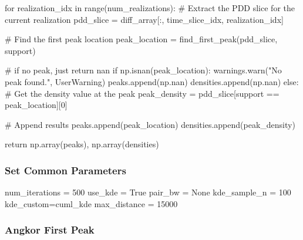 \documentclass[
  11pt,
  letterpaper,
  DIV=11,
  numbers=noendperiod]{scrartcl}
\newenvironment{Shaded}{\begin{snugshade}}{\end{snugshade}}
\newcommand{\BuiltInTok}[1]{\textcolor[rgb]{0.00,0.23,0.31}{#1}}
\newcommand{\CommentTok}[1]{\textcolor[rgb]{0.37,0.37,0.37}{#1}}
\newcommand{\ControlFlowTok}[1]{\textcolor[rgb]{0.00,0.23,0.31}{#1}}
\newcommand{\DecValTok}[1]{\textcolor[rgb]{0.68,0.00,0.00}{#1}}
\newcommand{\KeywordTok}[1]{\textcolor[rgb]{0.00,0.23,0.31}{#1}}
\newcommand{\NormalTok}[1]{\textcolor[rgb]{0.00,0.23,0.31}{#1}}
\newcommand{\OperatorTok}[1]{\textcolor[rgb]{0.37,0.37,0.37}{#1}}
\newcommand{\PreprocessorTok}[1]{\textcolor[rgb]{0.68,0.00,0.00}{#1}}
\newcommand{\StringTok}[1]{\textcolor[rgb]{0.13,0.47,0.30}{#1}}
\newcommand{\VariableTok}[1]{\textcolor[rgb]{0.07,0.07,0.07}{#1}}
\begin{document}
\begin{Shaded}
\begin{Highlighting}[]
    \ControlFlowTok{for}\NormalTok{ realization\_idx }\KeywordTok{in} \BuiltInTok{range}\NormalTok{(num\_realizations):}
        \CommentTok{\# Extract the PDD slice for the current realization}
\NormalTok{        pdd\_slice }\OperatorTok{=}\NormalTok{ diff\_array[:, time\_slice\_idx, realization\_idx]}

        \CommentTok{\# Find the first peak location}
\NormalTok{        peak\_location }\OperatorTok{=}\NormalTok{ find\_first\_peak(pdd\_slice, support)}
        
        \CommentTok{\# if no peak, just return nan}
        \ControlFlowTok{if}\NormalTok{ np.isnan(peak\_location):}
\NormalTok{            warnings.warn(}\StringTok{"No peak found."}\NormalTok{, }\PreprocessorTok{UserWarning}\NormalTok{)}
\NormalTok{            peaks.append(np.nan)}
\NormalTok{            densities.append(np.nan)}
        \ControlFlowTok{else}\NormalTok{:}
            \CommentTok{\# Get the density value at the peak}
\NormalTok{            peak\_density }\OperatorTok{=}\NormalTok{ pdd\_slice[support }\OperatorTok{==}\NormalTok{ peak\_location][}\DecValTok{0}\NormalTok{]}

            \CommentTok{\# Append results}
\NormalTok{            peaks.append(peak\_location)}
\NormalTok{            densities.append(peak\_density)}

    \ControlFlowTok{return}\NormalTok{ np.array(peaks), np.array(densities)}
\end{Highlighting}
\end{Shaded}

\subsubsection{Set Common Parameters}\label{set-common-parameters}

\begin{Shaded}
\begin{Highlighting}[]
\NormalTok{num\_iterations }\OperatorTok{=} \DecValTok{500}
\NormalTok{use\_kde }\OperatorTok{=} \VariableTok{True}
\NormalTok{pair\_bw }\OperatorTok{=} \VariableTok{None}
\NormalTok{kde\_sample\_n }\OperatorTok{=} \DecValTok{100}
\NormalTok{kde\_custom}\OperatorTok{=}\NormalTok{cuml\_kde}
\NormalTok{max\_distance }\OperatorTok{=} \DecValTok{15000}
\end{Highlighting}
\end{Shaded}

\subsubsection{Angkor First Peak}\label{angkor-first-peak}
\end{document}
